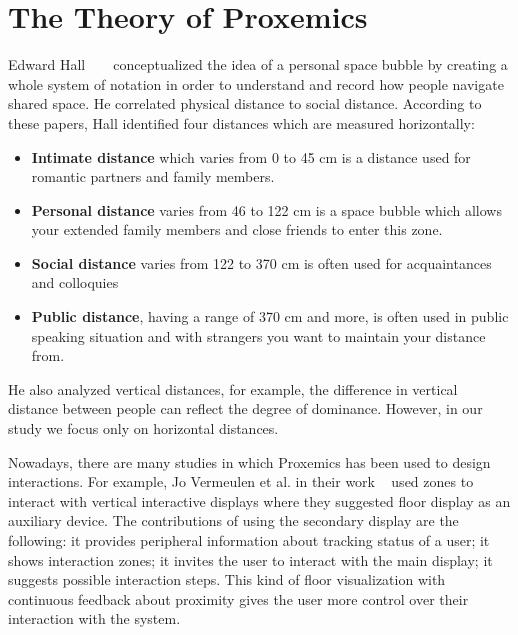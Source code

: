 \section{The Theory of Proxemics}
\label{sec:The Theory of Proxemics}
Edward Hall ~\cite{hall1963system} ~\cite{hall1910hidden} conceptualized the idea of a personal space bubble by creating a whole system of notation in order to understand and record how people navigate shared space. He correlated physical distance to social distance. According to these papers, Hall identified four distances which are measured horizontally:
\begin{itemize}
  \item \textbf{Intimate distance} which varies from 0 to 45 cm is a distance used for romantic partners and family members.
  \item \textbf{Personal distance} varies from 46 to 122 cm is a space bubble which allows your extended family members and close friends to enter this zone.
  \item \textbf{Social distance} varies from 122 to 370 cm is often used for acquaintances and colloquies
  \item \textbf{Public distance}, having a range of 370 cm and more, is often used in public speaking situation and with strangers you want to maintain your distance from.
\end{itemize}

He also analyzed vertical distances, for example, the difference in vertical distance between people can reflect the degree of dominance. However, in our study we focus only on horizontal distances.

\par Nowadays, there are many studies in which Proxemics has been used to design interactions. For example, Jo Vermeulen et al. in their work ~\cite{vermeulen2015proxemic} used zones to interact with vertical interactive displays where they suggested floor display as an auxiliary device. The contributions of using the secondary display are the following: it provides peripheral information about tracking status of a user; it shows interaction zones; it invites the user to interact with the main display; it suggests possible interaction steps. This kind of floor visualization with continuous feedback about proximity gives the user more control over their interaction with the system.

